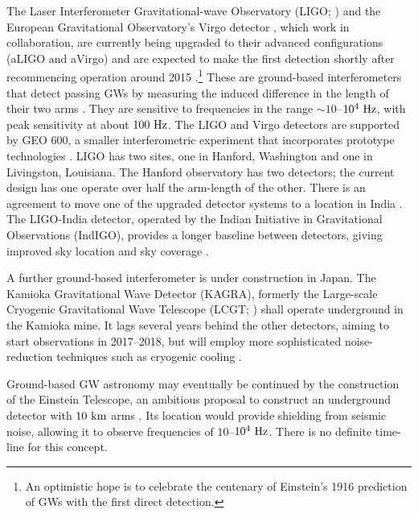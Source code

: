 The Laser Interferometer Gravitational-wave Observatory (LIGO; \citealt{Abramovici1992}) and the European Gravitational Observatory's Virgo detector \citep{Acernese2008a}, which work in collaboration, are currently being upgraded to their advanced configurations (aLIGO and aVirgo) and are expected to make the first detection shortly after recommencing operation around 2015 \citep{Harry2010,Accadia2011}.\footnote{An optimistic hope is to celebrate the centenary of Einstein's 1916 prediction of GWs \citep[document 32]{Einstein1997} with the first direct detection.} These are ground-based interferometers that detect passing GWs by measuring the induced difference in the length of their two arms \citep{Pitkin2011}. They are sensitive to frequencies in the range $\sim10$--$10^4~\mathrm{Hz}$, with peak sensitivity at about $100~\mathrm{Hz}$. The LIGO and Virgo detectors are supported by GEO 600, a smaller interferometric experiment that incorporates prototype technologies \citep{Willke2002,Willke2006}. LIGO has two sites, one in Hanford, Washington and one in Livingston, Louisiana. The Hanford observatory has two detectors; the current design has one operate over half the arm-length of the other. There is an agreement to move one of the upgraded detector systems to a location in India \citep{Unnikrishnan2013}. The LIGO-India detector, operated by the Indian Initiative in Gravitational Observations (IndIGO), provides a longer baseline between detectors, giving improved sky location and sky coverage \citep{Schutz2011}.

A further ground-based interferometer is under construction in Japan. The Kamioka Gravitational Wave Detector (KAGRA), formerly the Large-scale Cryogenic Gravitational Wave Telescope (LCGT; \citealt{Kuroda1999,Kuroda2010}) shall operate underground in the Kamioka mine. It lags several years behind the other detectors, aiming to start observations in 2017--2018, but will employ more sophisticated noise-reduction techniques such as cryogenic cooling \citep{Somiya2012}.

Ground-based GW astronomy may eventually be continued by the construction of the Einstein Telescope, an ambitious proposal to construct an underground detector with $10~\mathrm{km}$ arms \citep{Punturo2010,Hild2011,Sathyaprakash2012}. Its location would provide shielding from seismic noise, allowing it to observe frequencies of $10$--$10^4~\mathrm{Hz}$. There is no definite time-line for this concept.

